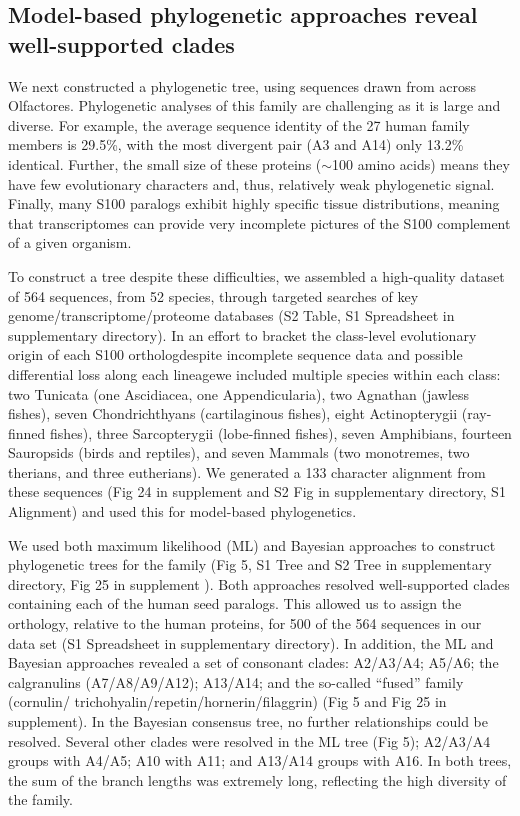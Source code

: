 \subsection{Model-based phylogenetic approaches reveal well-supported clades}

We next constructed a phylogenetic tree, using sequences drawn from
across Olfactores. Phylogenetic analyses of this family are challenging
as it is large and diverse. For example, the average sequence identity
of the 27 human family members is 29.5\%, with the most divergent
pair (A3 and A14) only 13.2\% identical. Further, the small size of
these proteins ($\sim$100 amino acids) means they have few evolutionary
characters and, thus, relatively weak phylogenetic signal. Finally,
many S100 paralogs exhibit highly specific tissue distributions, meaning
that transcriptomes can provide very incomplete pictures of the S100
complement of a given organism.

To construct a tree despite these difficulties, we assembled a high-quality
dataset of 564 sequences, from 52 species, through targeted searches
of key genome/transcriptome/proteome databases (S2 Table, S1 Spreadsheet in supplementary directory).
In an effort to bracket the class-level evolutionary origin of each
S100 ortholog\textemdash despite incomplete sequence data and possible
differential loss along each lineage\textemdash we included multiple
species within each class: two Tunicata (one Ascidiacea, one Appendicularia),
two Agnathan (jawless fishes), seven Chondrichthyans (cartilaginous
fishes), eight Actinopterygii (ray-finned fishes), three Sarcopterygii
(lobe-finned fishes), seven Amphibians, fourteen Sauropsids (birds
and reptiles), and seven Mammals (two monotremes, two therians, and
three eutherians). We generated a 133 character alignment from these
sequences (Fig 24 in supplement and S2 Fig in supplementary directory, S1 Alignment) and used this for model-based
phylogenetics.

We used both maximum likelihood (ML) and Bayesian approaches to construct
phylogenetic trees for the family (Fig 5, S1 Tree and S2 Tree in supplementary directory, Fig 25 in supplement
). Both approaches resolved well-supported clades containing each
of the human seed paralogs. This allowed us to assign the orthology,
relative to the human proteins, for 500 of the 564 sequences in our
data set (S1 Spreadsheet in supplementary directory). In addition, the ML and Bayesian approaches
revealed a set of consonant clades: A2/A3/A4; A5/A6; the calgranulins
(A7/A8/A9/A12); A13/A14; and the so-called \textquotedblleft fused\textquotedblright{}
family (cornulin/ trichohyalin/repetin/hornerin/filaggrin) (Fig 5
and Fig 25 in supplement). In the Bayesian consensus tree, no further relationships
could be resolved. Several other clades were resolved in the ML tree
(Fig 5); A2/A3/A4 groups with A4/A5; A10 with A11; and A13/A14 groups
with A16. In both trees, the sum of the branch lengths was extremely
long, reflecting the high diversity of the family.

